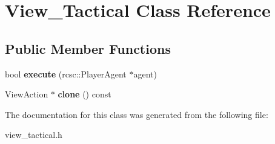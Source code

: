 \hypertarget{classView__Tactical}{
\section{View\_\-Tactical Class Reference}
\label{classView__Tactical}
}
\subsection*{Public Member Functions}
\begin{DoxyCompactItemize}
\item 
\hypertarget{classView__Tactical_a325f6e4f5c45febbf77ba71502e41af8}{
bool {\bfseries execute} (rcsc::PlayerAgent $\ast$agent)}
\label{classView__Tactical_a325f6e4f5c45febbf77ba71502e41af8}

\item 
\hypertarget{classView__Tactical_ae2b78991033d9d0e3869c4377cd59e3d}{
ViewAction $\ast$ {\bfseries clone} () const }
\label{classView__Tactical_ae2b78991033d9d0e3869c4377cd59e3d}

\end{DoxyCompactItemize}


The documentation for this class was generated from the following file:\begin{DoxyCompactItemize}
\item 
view\_\-tactical.h\end{DoxyCompactItemize}
